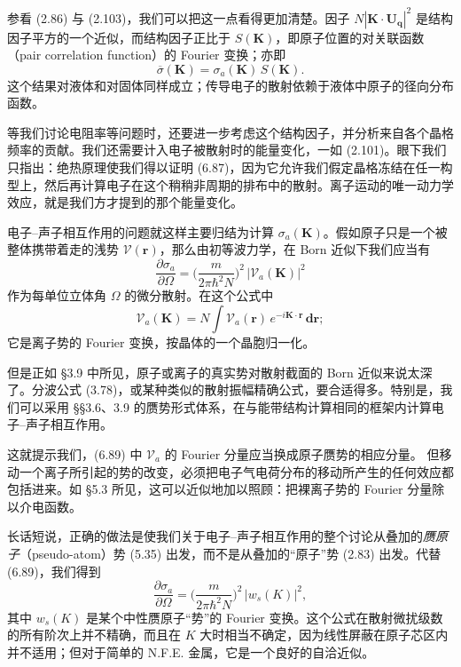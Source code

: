 参看 (2.86) 与 (2.103)，我们可以把这一点看得更加清楚。因子 $N|\mathbf{K}\cdot\mathbf{U}_{\mathbf{q}}|^{2}$ 是结构因子平方的一个近似，而结构因子正比于 $S(\mathbf{K})$，即原子位置的对关联函数（pair correlation function）的 Fourier 变换；亦即
\begin{equation*}
\overline{\sigma}(\mathbf{K}) = \sigma_{a}(\mathbf{K})\,S(\mathbf{K}). \tag{6.88}
\end{equation*}
这个结果对液体和对固体同样成立；传导电子的散射依赖于液体中原子的径向分布函数。

等我们讨论电阻率等问题时，还要进一步考虑这个结构因子，并分析来自各个晶格频率的贡献。我们还需要计入电子被散射时的能量变化，一如 (2.101)。眼下我们只指出：绝热原理使我们得以证明 (6.87)，因为它允许我们假定晶格冻结在任一构型上，然后再计算电子在这个稍稍非周期的排布中的散射。离子运动的唯一动力学效应，就是我们方才提到的那个能量变化。

电子--声子相互作用的问题就这样主要归结为计算 $\sigma_{a}(\mathbf{K})$。假如原子只是一个被整体携带着走的浅势 $\mathcal{V}(\mathbf{r})$，那么由初等波力学，在 Born 近似下我们应当有
\begin{equation*}
\frac{\partial\sigma_{a}}{\partial\Omega} = \biggl(\frac{m}{2\pi\hbar^{2}N}\biggr)^{2}\,|\mathcal{V}_{a}(\mathbf{K})|^{2} \tag{6.89}
\end{equation*}
作为每单位立体角 $\Omega$ 的微分散射。在这个公式中
\begin{equation*}
\mathcal{V}_{a}(\mathbf{K}) = N\int\mathcal{V}_{a}(\mathbf{r})\,e^{-i\mathbf{K}\cdot\mathbf{r}}\,\mathbf{dr}; \tag{6.90}
\end{equation*}
它是离子势的 Fourier 变换，按晶体的一个晶胞归一化。

但是正如 §3.9 中所见，原子或离子的真实势对散射截面的 Born 近似来说太深了。分波公式 (3.78)，或某种类似的散射振幅精确公式，要合适得多。特别是，我们可以采用 §§3.6、3.9 的赝势形式体系，在与能带结构计算相同的框架内计算电子--声子相互作用。

这就提示我们，(6.89) 中 $\mathcal{V}_{a}$ 的 Fourier 分量应当换成原子赝势的相应分量。
但移动一个离子所引起的势的改变，必须把电子气电荷分布的移动所产生的任何效应都包括进来。如 §5.3 所见，这可以近似地加以照顾：把裸离子势的 Fourier 分量除以介电函数。

长话短说，正确的做法是使我们关于电子--声子相互作用的整个讨论从叠加的\emph{赝原子}（pseudo-atom）势 (5.35) 出发，而不是从叠加的“原子”势 (2.83) 出发。代替 (6.89)，我们得到
\begin{equation*}
\frac{\partial\sigma_{a}}{\partial\Omega} = \biggl(\frac{m}{2\pi\hbar^{2}N}\biggr)^{2}\,|w_{s}(K)|^{2}, \tag{6.91}
\end{equation*}
其中 $w_{s}(K)$ 是某个中性赝原子“势”的 Fourier 变换。这个公式在散射微扰级数的所有阶次上并不精确，而且在 $K$ 大时相当不确定，因为线性屏蔽在原子芯区内并不适用；但对于简单的 N.F.E. 金属，它是一个良好的自洽近似。

